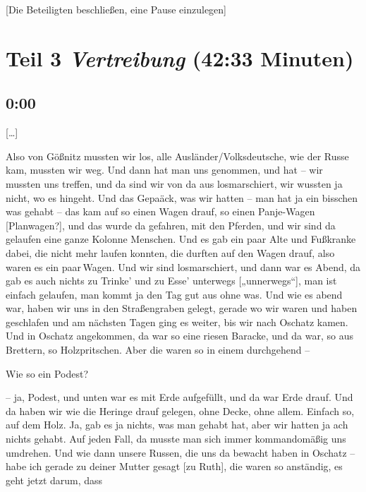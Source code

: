 \documentclass[ngerman,]{article}
\providecommand{\tightlist}{%
  \setlength{\itemsep}{0pt}\setlength{\parskip}{0pt}}
\begin{document}
\begin{multicols}{2}
{[}Die Beteiligten beschließen, eine Pause einzulegen{]}

\hypertarget{vertreibung}{%
\section{\texorpdfstring{Teil 3 \emph{Vertreibung} (42:33
Minuten)}{Teil 3 Vertreibung (42:33 Minuten)}}\label{vertreibung}}

\hypertarget{section-7}{%
\subsection{0:00}\label{section-7}}

{[}\ldots{}{]}

\begin{description}
\tightlist
\item[Käthe]
Also von Gößnitz mussten wir los, alle Ausländer/Volksdeutsche, wie der
Russe kam, mussten wir weg. Und dann hat man uns genommen, und hat – wir
mussten uns treffen, und da sind wir von da aus losmarschiert, wir
wussten ja nicht, wo es hingeht. Und das Gepaäck, was wir hatten – man
hat ja ein bisschen was gehabt – das kam auf so einen Wagen drauf, so
einen Panje-Wagen {[}Planwagen?{]}, und das wurde da gefahren, mit den
Pferden, und wir sind da gelaufen eine ganze Kolonne Menschen. Und es
gab ein paar Alte und Fußkranke dabei, die nicht mehr laufen konnten,
die durften auf den Wagen drauf, also waren es ein paar\,Wagen. Und wir
sind losmarschiert, und dann war es Abend, da gab es auch nichts zu
Trinke' und zu Esse' unterwegs {[}„unnerwegs“{]}, man ist einfach
gelaufen, man kommt ja den Tag gut aus ohne was. Und wie es abend war,
haben wir uns in den Straßengraben gelegt, gerade wo wir waren und haben
geschlafen und am nächsten Tagen ging es weiter, bis wir nach Oschatz
kamen. Und in Oschatz angekommen, da war so eine riesen Baracke, und da
war, so aus Brettern, so Holzpritschen. Aber die waren so in einem
durchgehend –
\item[Ruth]
Wie so ein Podest?
\item[Käthe]
– ja, Podest, und unten war es mit Erde aufgefüllt, und da war Erde
drauf. Und da haben wir wie die Heringe drauf gelegen, ohne Decke, ohne
allem. Einfach so, auf dem Holz. Ja, gab es ja nichts, was man gehabt
hat, aber wir hatten ja ach nichts gehabt. Auf jeden Fall, da musste man
sich immer kommandomäßig uns umdrehen. Und wie dann unsere Russen, die
uns da bewacht haben in Oschatz – habe ich gerade zu deiner Mutter
gesagt {[}zu Ruth{]}, die waren so anständig, es geht jetzt darum, dass

\end{description}
\end{multicols}
\end{document}
